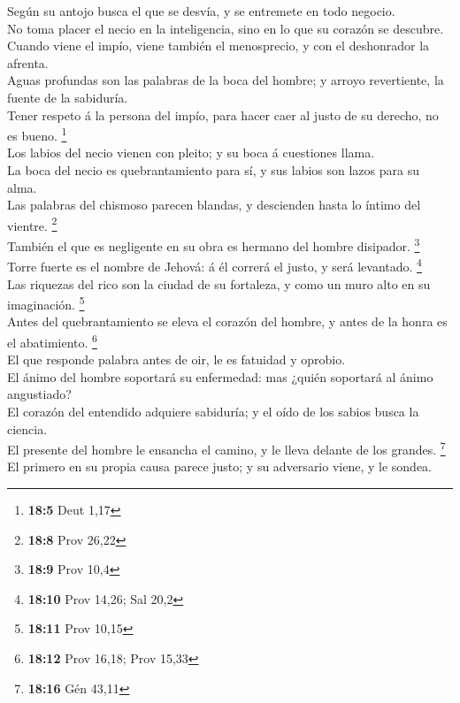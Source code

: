  Según su antojo busca el que se desvía, y se entremete en
todo negocio.\\
 No toma placer el necio en la inteligencia, sino en lo que
su corazón se descubre.\\
 Cuando viene el impío, viene también el menosprecio, y con
el deshonrador la afrenta.\\
 Aguas profundas son las palabras de la boca del hombre; y
arroyo revertiente, la fuente de la sabiduría.\\
 Tener respeto á la persona del impío, para hacer caer al
justo de su derecho, no es bueno. \footnote{\textbf{18:5} Deut 1,17}\\
 Los labios del necio vienen con pleito; y su boca á
cuestiones llama.\\
 La boca del necio es quebrantamiento para sí, y sus labios
son lazos para su alma.\\
 Las palabras del chismoso parecen blandas, y descienden
hasta lo íntimo del vientre. \footnote{\textbf{18:8} Prov 26,22}\\
 También el que es negligente en su obra es hermano del
hombre disipador. \footnote{\textbf{18:9} Prov 10,4}\\
 Torre fuerte es el nombre de Jehová: á él correrá el
justo, y será levantado. \footnote{\textbf{18:10} Prov 14,26; Sal 20,2}\\
 Las riquezas del rico son la ciudad de su fortaleza, y
como un muro alto en su imaginación. \footnote{\textbf{18:11} Prov 10,15}\\
 Antes del quebrantamiento se eleva el corazón del hombre,
y antes de la honra es el abatimiento. \footnote{\textbf{18:12} Prov
  16,18; Prov 15,33}\\
 El que responde palabra antes de oir, le es fatuidad y
oprobio.\\
 El ánimo del hombre soportará su enfermedad: mas ¿quién
soportará al ánimo angustiado?\\
 El corazón del entendido adquiere sabiduría; y el oído de
los sabios busca la ciencia.\\
 El presente del hombre le ensancha el camino, y le lleva
delante de los grandes. \footnote{\textbf{18:16} Gén 43,11}\\
 El primero en su propia causa parece justo; y su
adversario viene, y le sondea.\\
